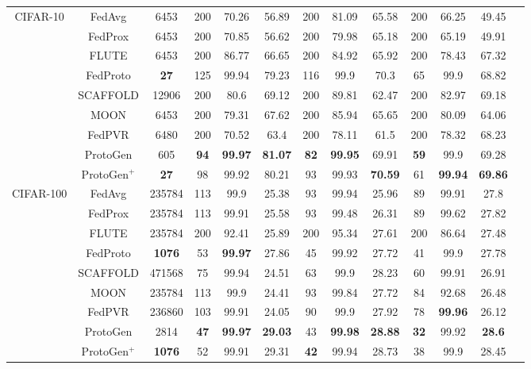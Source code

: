 \documentclass[lettersize,journal]{IEEEtran}
\begin{document}
\begin{table}[t]
{\begin{tabular}{ccccccccccccc}
\midrule
\multirow{9}{2cm}{\centering CIFAR-10} 
& FedAvg   & 6453 & 200 & 70.26 & 56.89 & 200 & 81.09 & 65.58 & 200 & 66.25 & 49.45  \\
& FedProx & 6453 & 200 & 70.85 & 56.62 & 200 & 79.98 & 65.18 & 200 & 65.19 & 49.91 \\
& FLUTE   & 6453 & 200 & 86.77 & 66.65 & 200 & 84.92 & 65.92 & 200 & 78.43 & 67.32 \\
& FedProto & \textbf{27} & 125 & 99.94 & 79.23 & 116 & 99.9 & 70.3 & 65 & 99.9 & 68.82 \\
& SCAFFOLD & 12906 & 200 & 80.6 & 69.12 & 200 & 89.81 & 62.47 & 200 & 82.97 & 69.18 \\
& MOON     & 6453 & 200 & 79.31 & 67.62 & 200 & 85.94 & 65.65 & 200 & 80.09 & 64.06 \\
& FedPVR   & 6480 & 200 & 70.52 & 63.4 & 200 & 78.11 & 61.5 & 200 & 78.32 & 68.23 \\
& \textsf{ProtoGen}   & 605 & \textbf{94} & \textbf{99.97} & \textbf{81.07} & \textbf{82} & \textbf{99.95} & 69.91 & \textbf{59} & 99.9 & 69.28 \\
& \textsf{ProtoGen}$^+$   & \textbf{27} & 98 & 99.92 & 80.21 & 93 & 99.93 & \textbf{70.59} & 61 & \textbf{99.94} & \textbf{69.86} \\
\midrule
\multirow{9}{2cm}{\centering CIFAR-100} 
& FedAvg   & 235784 & 113 & 99.9 & 25.38 & 93 & 99.94 & 25.96 & 89 & 99.91 & 27.8 \\
& FedProx & 235784 & 113 & 99.91 & 25.58 & 93 & 99.48 & 26.31 & 89 & 99.62 & 27.82 \\
& FLUTE   & 235784 & 200 & 92.41 & 25.89 & 200 & 95.34 & 27.61 & 200 & 86.64 & 27.48 \\
& FedProto & \textbf{1076} & 53 & \textbf{99.97} & 27.86 & 45 & 99.92 & 27.72 & 41 & 99.9 & 27.78 \\
& SCAFFOLD & 471568 & 75 & 99.94 & 24.51 & 63 & 99.9 & 28.23 & 60 & 99.91 & 26.91 \\
& MOON     & 235784 & 113 & 99.9 & 24.41 & 93 & 99.84 & 27.72 & 84 & 92.68 & 26.48 \\
& FedPVR   & 236860 & 103 & 99.91 & 24.05 & 90 & 99.9 & 27.92 & 78 & \textbf{99.96} & 26.12 \\
& \textsf{ProtoGen}   & 2814 & \textbf{47} & \textbf{99.97} & \textbf{29.03} & 43 & \textbf{99.98} & \textbf{28.88} & \textbf{32} & 99.92 & \textbf{28.6}  \\
& \textsf{ProtoGen}$^+$   & \textbf{1076} & 52 & 99.91 & 29.31 & \textbf{42} & 99.94 & 28.73 & 38 & 99.9 & 28.45  \\
\bottomrule
\end{tabular}
}
\end{table}
\end{document}
